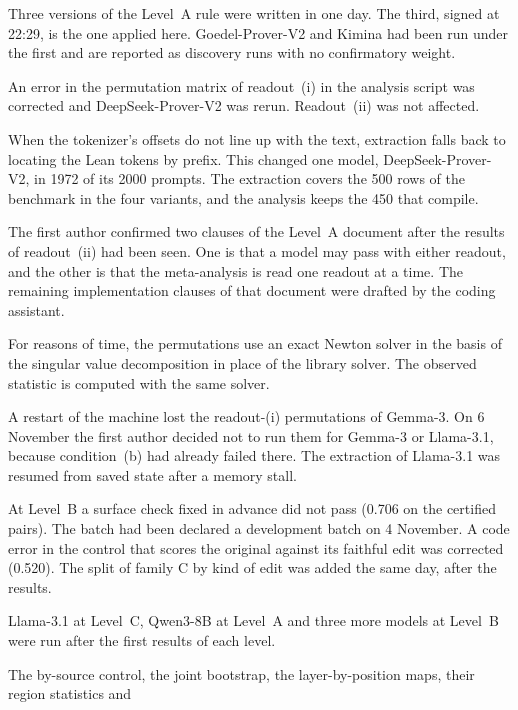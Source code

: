 \documentclass[10pt]{article}
\begin{document}
\begin{description}[leftmargin=1.2em]
\item[4 Nov] Three versions of the Level~A rule were written in one day. The third, signed at 22:29, is the one
applied here. Goedel-Prover-V2 and Kimina had been run under the first and are reported as discovery runs with no confirmatory weight.
\item[5 Nov, 08:37] An error in the permutation matrix of readout~(i) in the analysis script was corrected and
DeepSeek-Prover-V2 was rerun. Readout~(ii) was not affected.
\item[5 Nov] When the tokenizer's offsets do not line up with the text, extraction falls back to locating the Lean
tokens by prefix. This changed one model, DeepSeek-Prover-V2, in 1972 of its 2000 prompts.
The extraction covers the 500 rows of the benchmark in the four variants, and the analysis keeps the 450 that
compile.
\item[5 Nov] The first author confirmed two clauses of the Level~A document after the results of readout~(ii) had
been seen. One is that a model may pass with either readout, and the other is that the meta-analysis is read one
readout at a time. The remaining implementation clauses of that document were drafted by the coding assistant.
\item[5 Nov] For reasons of time, the permutations use an exact Newton solver in the basis of the singular value
decomposition in place of the library solver. The observed statistic is computed with the same solver.
\item[5--6 Nov] A restart of the machine lost the readout-(i) permutations of Gemma-3. On 6 November the first
author decided not to run them for Gemma-3 or Llama-3.1, because condition~(b) had already failed there. The
extraction of Llama-3.1 was resumed from saved state after a memory stall.
\item[6 Nov] At Level~B a surface check fixed in advance did not pass (0.706 on the certified pairs). The batch had been declared a development batch on 4 November. A code error in the control that scores the original against its faithful edit was
corrected (0.520). The split of family C by kind of edit was added the same day, after the results.
\item[7--8 Nov] Llama-3.1 at Level~C, Qwen3-8B at Level~A and three more models at Level~B were run after the
first results of each level.
\item[9 Nov] The by-source control, the joint bootstrap, the layer-by-position maps, their region statistics and

\end{description}
\end{document}
